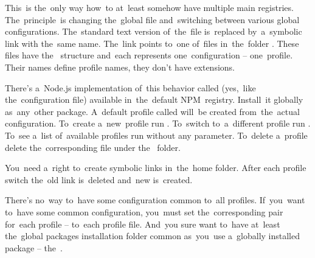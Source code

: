 \emten
{}
\label{npmprofile}
This~is the~only way how~to at~least somehow have multiple main registries.
The~principle~is changing the~global  file and~switching between various global configurations.
The~standard text version of~the~file is~replaced by~a~symbolic link with the~same name.
The~link points to~one of~files in~the~folder .
These files have the~ structure and~each represents one~configuration -- one~profile.
Their names define profile names, they don't have extensions.

There's a~Node.js implementation of~this behavior called  (yes,~like the~configuration file) available in~the~default NPM~registry.
Install~it globally as~any~other package.
A~default profile called  will~be created from~the~actual configuration.
To~create a~new~profile run .
To~switch to~a~different profile run .
To~see a~list of~available profiles run  without any parameter.
To~delete a~profile delete the~corresponding file under the~ folder.
\newpage

\warning You~need a~right to~create symbolic links in~the~home folder.
After each profile switch the~old  link is~deleted and~new is~created.

\warning There's no~way to~have some configuration common to~all profiles.
If~you~want to~have some common configuration, you~must set the~corresponding  pair for~each profile -- to~each profile file.
And~you sure want to~have at~least the~global packages installation folder common as~you~use a~globally installed package -- the~.
